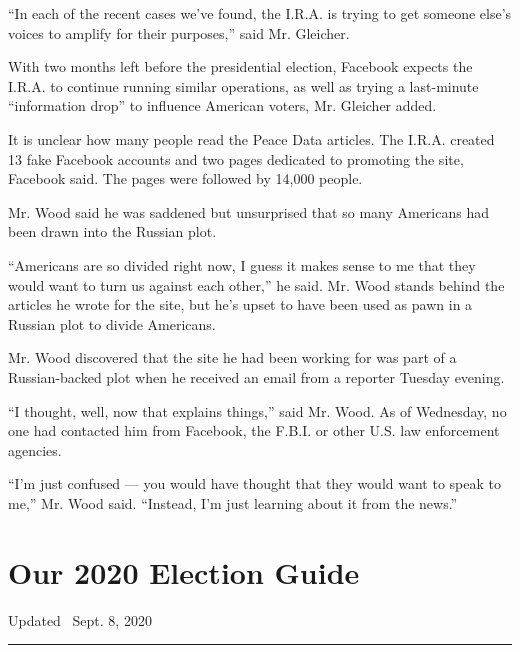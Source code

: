 ``In each of the recent cases we've found, the I.R.A. is trying to get
someone else's voices to amplify for their purposes,'' said Mr.
Gleicher.

With two months left before the presidential election, Facebook expects
the I.R.A. to continue running similar operations, as well as trying a
last-minute ``information drop'' to influence American voters, Mr.
Gleicher added.

It is unclear how many people read the Peace Data articles. The I.R.A.
created 13 fake Facebook accounts and two pages dedicated to promoting
the site, Facebook said. The pages were followed by 14,000 people.

Mr. Wood said he was saddened but unsurprised that so many Americans had
been drawn into the Russian plot.

``Americans are so divided right now, I guess it makes sense to me that
they would want to turn us against each other,'' he said. Mr. Wood
stands behind the articles he wrote for the site, but he's upset to have
been used as pawn in a Russian plot to divide Americans.

Mr. Wood discovered that the site he had been working for was part of a
Russian-backed plot when he received an email from a reporter Tuesday
evening.

``I thought, well, now that explains things,'' said Mr. Wood. As of
Wednesday, no one had contacted him from Facebook, the F.B.I. or other
U.S. law enforcement agencies.

``I'm just confused --- you would have thought that they would want to
speak to me,'' Mr. Wood said. ``Instead, I'm just learning about it from
the news.''

\hypertarget{our-2020-election-guide}{%
\section{Our 2020 Election Guide}\label{our-2020-election-guide}}

Updated ~Sept. 8, 2020

\begin{center}\rule{0.5\linewidth}{\linethickness}\end{center}

